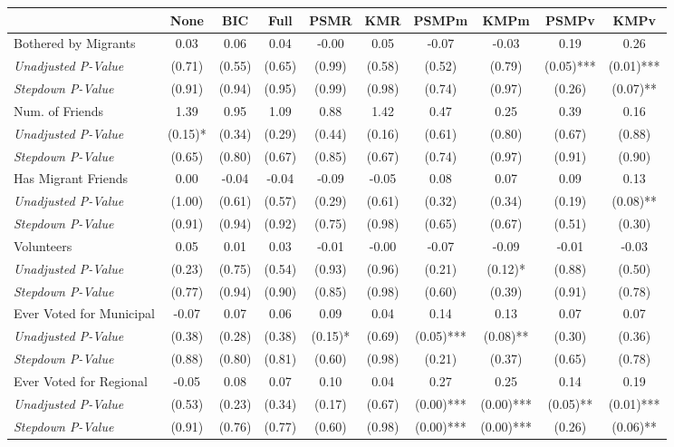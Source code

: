 \begin{tabular}{l c c c c c c c c c}
\toprule
 & None & BIC & Full & PSMR & KMR & PSMPm & KMPm & PSMPv & KMPv \\
\midrule
Bothered by Migrants & 0.03 & 0.06 & 0.04 & -0.00 & 0.05 & -0.07 & -0.03 & 0.19 & 0.26 \\
\quad \textit{Unadjusted P-Value} & (0.71) & (0.55) & (0.65) & (0.99) & (0.58) & (0.52) & (0.79) & (0.05)*** & (0.01)*** \\
\quad \textit{Stepdown P-Value} & (0.91) & (0.94) & (0.95) & (0.99) & (0.98) & (0.74) & (0.97) & (0.26) & (0.07)** \\
Num. of Friends & 1.39 & 0.95 & 1.09 & 0.88 & 1.42 & 0.47 & 0.25 & 0.39 & 0.16 \\
\quad \textit{Unadjusted P-Value} & (0.15)* & (0.34) & (0.29) & (0.44) & (0.16) & (0.61) & (0.80) & (0.67) & (0.88) \\
\quad \textit{Stepdown P-Value} & (0.65) & (0.80) & (0.67) & (0.85) & (0.67) & (0.74) & (0.97) & (0.91) & (0.90) \\
Has Migrant Friends & 0.00 & -0.04 & -0.04 & -0.09 & -0.05 & 0.08 & 0.07 & 0.09 & 0.13 \\
\quad \textit{Unadjusted P-Value} & (1.00) & (0.61) & (0.57) & (0.29) & (0.61) & (0.32) & (0.34) & (0.19) & (0.08)** \\
\quad \textit{Stepdown P-Value} & (0.91) & (0.94) & (0.92) & (0.75) & (0.98) & (0.65) & (0.67) & (0.51) & (0.30) \\
Volunteers & 0.05 & 0.01 & 0.03 & -0.01 & -0.00 & -0.07 & -0.09 & -0.01 & -0.03 \\
\quad \textit{Unadjusted P-Value} & (0.23) & (0.75) & (0.54) & (0.93) & (0.96) & (0.21) & (0.12)* & (0.88) & (0.50) \\
\quad \textit{Stepdown P-Value} & (0.77) & (0.94) & (0.90) & (0.85) & (0.98) & (0.60) & (0.39) & (0.91) & (0.78) \\
Ever Voted for Municipal & -0.07 & 0.07 & 0.06 & 0.09 & 0.04 & 0.14 & 0.13 & 0.07 & 0.07 \\
\quad \textit{Unadjusted P-Value} & (0.38) & (0.28) & (0.38) & (0.15)* & (0.69) & (0.05)*** & (0.08)** & (0.30) & (0.36) \\
\quad \textit{Stepdown P-Value} & (0.88) & (0.80) & (0.81) & (0.60) & (0.98) & (0.21) & (0.37) & (0.65) & (0.78) \\
Ever Voted for Regional & -0.05 & 0.08 & 0.07 & 0.10 & 0.04 & 0.27 & 0.25 & 0.14 & 0.19 \\
\quad \textit{Unadjusted P-Value} & (0.53) & (0.23) & (0.34) & (0.17) & (0.67) & (0.00)*** & (0.00)*** & (0.05)** & (0.01)*** \\
\quad \textit{Stepdown P-Value} & (0.91) & (0.76) & (0.77) & (0.60) & (0.98) & (0.00)*** & (0.00)*** & (0.26) & (0.06)** \\
\bottomrule
\end{tabular}
